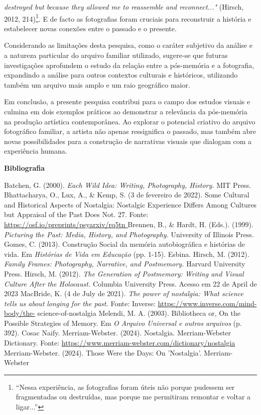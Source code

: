 \documentclass{article}
\begin{document}
\textit{destroyed but because they allowed me to reassemble and reconnect..." }(Hirsch, 2012, 
214)\footnote{“Nessa experiência, as fotografias foram úteis não porque pudessem ser fragmentadas ou destruídas, mas porque me permitiram remontar e voltar a ligar...” }. E de facto as fotografias foram cruciais para reconstruir a história e estabelecer 
novas conexões entre o passado e o presente. 
 
Considerando as limitações desta pesquisa, como o caráter subjetivo da análise e 
a natureza particular do arquivo familiar utilizado, sugere-se que futuras investigações 
aprofundem o estudo da relação entre a pós-memória e a fotografia, expandindo a análise 
para outros contextos culturais e históricos, utilizando também um arquivo mais amplo e 
um raio geográfico maior.  
 
Em conclusão, a presente pesquisa contribui para o campo dos estudos visuais e 
culmina  em  dois  exemplos  práticos  ao  demonstrar  a  relevância  da  pós-memória  na 
produção artística contemporânea. Ao explorar o potencial criativo do arquivo fotográfico 
familiar,  a  artista  não  apenas  ressignifica  o  passado,  mas  também  abre  novas 
possibilidades para a construção de narrativas visuais que dialogam com a experiência 
humana. 
   
 
 

 



   

\textbf{Bibliografia }
 

Batchen, G. (2000). \textit{Each Wild Idea: Writing, Photography, History.} MIT Press. 
Bhattacharya, O., Lux, A., \& Kemp, S. (3 de fevereiro de 2022). Some Cultural and 
Historical Aspects of Nostalgia: Nostalgic Experience Differs Among Cultures 
but Appraisal of the Past Does Not. 27. Fonte: 
\url{https://osf.io/preprints/psyarxiv/rq5tn }
Brennen, B., \& Hardt, H. (Eds.). (1999). \textit{Picturing the Past: Media, History, and }
\textit{Photography.} University of Illinois Press. 
Gomes, C. (2013). Construção Social da memória autobiográfica e histórias de vida. Em 
\textit{Histórias de Vida em Educação} (pp. 1-15). Esbina. 
Hirsch, M. (2012). \textit{Family Frames: Photography, Narrative, and Postmemory.} Harvard 
University Press. 
Hirsch, M. (2012). \textit{The Generation of Postmemory: Writing and Visual Culture After }
\textit{the Holocaust.} Columbia University Press. Acesso em 22 de April de 2023 
MacBride, K. (4 de July de 2021). \textit{The power of nostalgia: What science tells us about }
\textit{longing for the past.} Fonte: Inverse: \url{https://www.inverse.com/mind-body/the-}
science-of-nostalgia 
Melendi, M. A. (2003). Bibliotheca or, On the Possible Strategies of Memory. Em \textit{O }
\textit{Arquivo Universal e outros arquivos} (p. 392). Cosac Naify. 
Merriam-Webster. (2024). Nostalgia. Merriam-Webster Dictionary. Fonte: 
\url{https://www.merriam-webster.com/dictionary/nostalgia }
Merriam-Webster. (2024). Those Were the Days: On 'Nostalgia'. Merriam-Webster 
 
\end{document}
